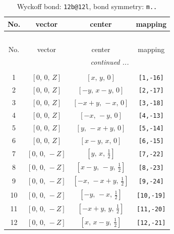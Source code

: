 \documentclass[fleqn,8pt]{jsarticle}
\begin{document}
\renewcommand{\arraystretch}{1.2}
\begin{longtable}{cccc}
\caption{Wyckoff bond: {\tt 12b@12l}, bond symmetry: {\tt m..}}
 \\
 \hline \hline
No. & vector & center & mapping \\ \hline \endfirsthead

\multicolumn{3}{l}{\tablename\ \thetable{}} \\
 \hline \hline
No. & vector & center & mapping \\ \hline \endhead

 \hline \hline
\multicolumn{3}{r}{\footnotesize\it continued ...} \\ \endfoot

 \hline \hline
\multicolumn{3}{r}{} \\ \endlastfoot

1 & $\left[ 0,\, 0,\, Z \right]$ & $\left[ x,\, y,\, 0 \right]$ & {\tt [1,-16]} \\ \hline
2 & $\left[ 0,\, 0,\, Z \right]$ & $\left[ - y,\, x - y,\, 0 \right]$ & {\tt [2,-17]} \\ \hline
3 & $\left[ 0,\, 0,\, Z \right]$ & $\left[ - x + y,\, - x,\, 0 \right]$ & {\tt [3,-18]} \\ \hline
4 & $\left[ 0,\, 0,\, Z \right]$ & $\left[ - x,\, - y,\, 0 \right]$ & {\tt [4,-13]} \\ \hline
5 & $\left[ 0,\, 0,\, Z \right]$ & $\left[ y,\, - x + y,\, 0 \right]$ & {\tt [5,-14]} \\ \hline
6 & $\left[ 0,\, 0,\, Z \right]$ & $\left[ x - y,\, x,\, 0 \right]$ & {\tt [6,-15]} \\ \hline
7 & $\left[ 0,\, 0,\, - Z \right]$ & $\left[ y,\, x,\, \frac{1}{2} \right]$ & {\tt [7,-22]} \\ \hline
8 & $\left[ 0,\, 0,\, - Z \right]$ & $\left[ x - y,\, - y,\, \frac{1}{2} \right]$ & {\tt [8,-23]} \\ \hline
9 & $\left[ 0,\, 0,\, - Z \right]$ & $\left[ - x,\, - x + y,\, \frac{1}{2} \right]$ & {\tt [9,-24]} \\ \hline
10 & $\left[ 0,\, 0,\, - Z \right]$ & $\left[ - y,\, - x,\, \frac{1}{2} \right]$ & {\tt [10,-19]} \\ \hline
11 & $\left[ 0,\, 0,\, - Z \right]$ & $\left[ - x + y,\, y,\, \frac{1}{2} \right]$ & {\tt [11,-20]} \\ \hline
12 & $\left[ 0,\, 0,\, - Z \right]$ & $\left[ x,\, x - y,\, \frac{1}{2} \right]$ & {\tt [12,-21]} \\
\end{longtable}
\end{document}
